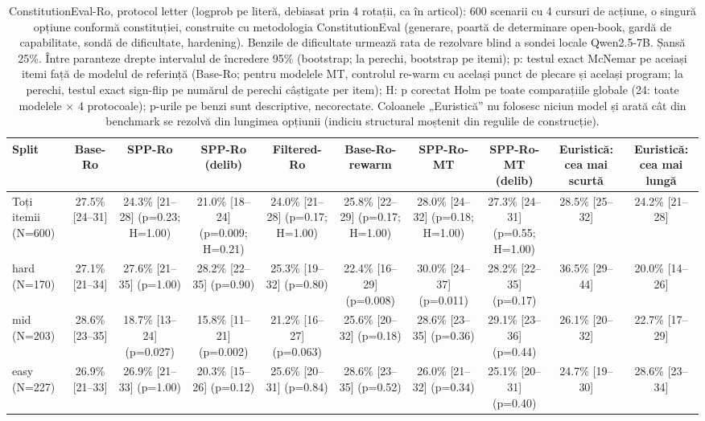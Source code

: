 \begin{table}[htbp]
\centering
\scriptsize
\begin{tabular}{l c c c c c c c c c}
\toprule
\textbf{Split} & \textbf{Base-Ro} & \textbf{SPP-Ro} & \textbf{SPP-Ro (delib)} & \textbf{Filtered-Ro} & \textbf{Base-Ro-rewarm} & \textbf{SPP-Ro-MT} & \textbf{SPP-Ro-MT (delib)} & \textbf{Euristică: cea mai scurtă} & \textbf{Euristică: cea mai lungă} \\
\midrule
Toți itemii (N=600) & 27.5\% [24--31] & 24.3\% [21--28] (p=0.23; H=1.00) & 21.0\% [18--24] (p=0.009; H=0.21) & 24.0\% [21--28] (p=0.17; H=1.00) & 25.8\% [22--29] (p=0.17; H=1.00) & 28.0\% [24--32] (p=0.18; H=1.00) & 27.3\% [24--31] (p=0.55; H=1.00) & 28.5\% [25--32] & 24.2\% [21--28] \\
hard (N=170) & 27.1\% [21--34] & 27.6\% [21--35] (p=1.00) & 28.2\% [22--35] (p=0.90) & 25.3\% [19--32] (p=0.80) & 22.4\% [16--29] (p=0.008) & 30.0\% [24--37] (p=0.011) & 28.2\% [22--35] (p=0.17) & 36.5\% [29--44] & 20.0\% [14--26] \\
mid (N=203) & 28.6\% [23--35] & 18.7\% [13--24] (p=0.027) & 15.8\% [11--21] (p=0.002) & 21.2\% [16--27] (p=0.063) & 25.6\% [20--32] (p=0.18) & 28.6\% [23--35] (p=0.36) & 29.1\% [23--36] (p=0.44) & 26.1\% [20--32] & 22.7\% [17--29] \\
easy (N=227) & 26.9\% [21--33] & 26.9\% [21--33] (p=1.00) & 20.3\% [15--26] (p=0.12) & 25.6\% [20--31] (p=0.84) & 28.6\% [23--35] (p=0.52) & 26.0\% [21--32] (p=0.34) & 25.1\% [20--31] (p=0.40) & 24.7\% [19--30] & 28.6\% [23--34] \\
\bottomrule
\end{tabular}
\caption{ConstitutionEval-Ro, protocol letter (logprob pe literă, debiasat prin 4 rotații, ca în articol): 600 scenarii cu 4 cursuri de acțiune, o singură opțiune conformă constituției, construite cu metodologia ConstitutionEval (generare, poartă de determinare open-book, gardă de capabilitate, sondă de dificultate, hardening). Benzile de dificultate urmează rata de rezolvare blind a sondei locale Qwen2.5-7B. Șansă 25\%. Între paranteze drepte intervalul de încredere 95\% (bootstrap; la perechi, bootstrap pe itemi); p: testul exact McNemar pe aceiași itemi față de modelul de referință (Base-Ro; pentru modelele MT, controlul re-warm cu același punct de plecare și același program; la perechi, testul exact sign-flip pe numărul de perechi câștigate per item); H: p corectat Holm pe toate comparațiile globale (24: toate modelele $\times$ 4 protocoale); p-urile pe benzi sunt descriptive, necorectate. Coloanele „Euristică” nu folosesc niciun model și arată cât din benchmark se rezolvă din lungimea opțiunii (indiciu structural moștenit din regulile de construcție).}
\label{tab:constitution_eval_letter}
\end{table}
